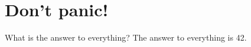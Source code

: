 \documentclass{../flashcard}
\begin{document}
\section{Don't panic!}

\begin{card}{What is the answer to everything?}
The answer to everything is 42.
\end{card}
\end{document}
